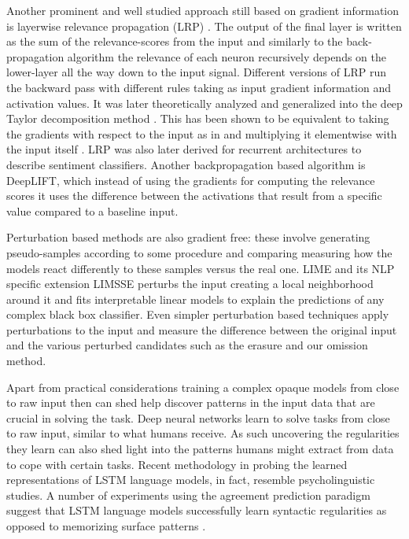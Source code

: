 Another prominent and well studied
approach still based on gradient information is layerwise
relevance propagation (LRP) \citep{bach2015pixel}. The output of the final layer
is written as the sum of the relevance-scores from the input and similarly to the back-propagation
algorithm the relevance of each neuron
recursively depends on the lower-layer all the way down to the input signal.
Different versions of LRP run the backward pass with different rules taking as
input gradient information and activation values. It was later theoretically analyzed and generalized
into the deep Taylor decomposition method \citep{binder2016layer}.
This has been shown to be equivalent to taking the
gradients with respect to the input as in \cite{simonyan2013deep} and multiplying it elementwise
with the input itself \citep{shrikumar2017learning}.
LRP was also later derived for recurrent architectures \citep{arras2017explaining} to describe
sentiment classifiers. Another backpropagation based algorithm is DeepLIFT, which instead of
using the gradients for computing the relevance scores it uses the difference between the activations
that result from a specific value compared to a baseline input.

Perturbation based methods are also gradient free: these involve generating
pseudo-samples according to some procedure and comparing measuring how the models
react differently to these samples versus the real one.
LIME \citep{ribeiro2016should} and its NLP specific extension LIMSSE
\citep{poerner2018evaluating} perturbs
the input creating a local neighborhood around it and fits interpretable linear models to explain
the predictions of any complex black box classifier.
Even simpler perturbation based techniques apply perturbations to the input and measure the
difference between the original input and the various perturbed candidates such as the erasure
\citep{li2016understanding} and our omission \citep{Kadar2016} method.

Apart from practical considerations training a complex opaque models
from close to raw input then can shed help discover patterns in the
input data that are crucial in solving the task.
Deep neural networks learn to solve tasks from close to raw input, similar to
what humans receive. As such
uncovering the regularities they learn can also shed light into the patterns
humans might extract from data to cope with certain tasks.
Recent methodology in probing the learned representations of LSTM language models,
in fact, resemble psycholinguistic studies.
A number of experiments using the agreement prediction paradigm
\citep{bock1991broken} suggest that LSTM language models successfully learn
syntactic regularities as opposed to memorizing surface patterns
\citep{linzen2016assessing,enguehard2017exploring,bernardy2017using,gulordava2018colorless}.

